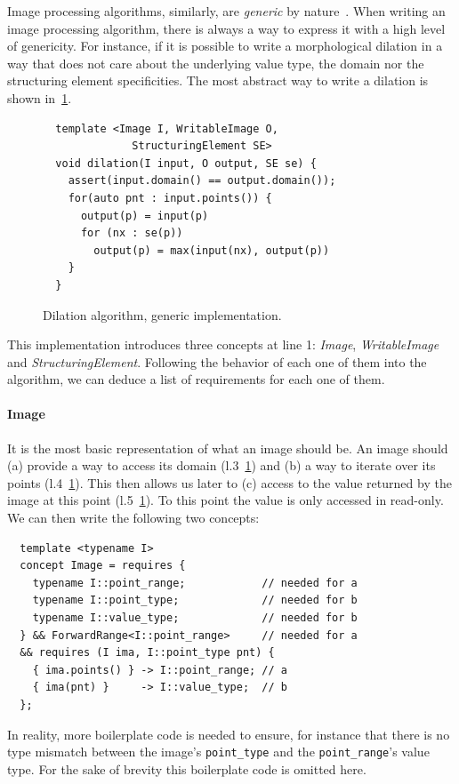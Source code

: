 Image processing algorithms, similarly, are \emph{generic} by
nature~\parencite{ritter.1990.cvgi,geraud.2000.icpr,darbon.2002.ismm,levillain.2010.icip,levillain.2014.ciarp}. When
writing an image processing algorithm, there is always a way to express it with a high level of genericity. For
instance, if it is possible to write a morphological dilation in a way that does not care about the underlying value
type, the domain nor the structuring element specificities. The most abstract way to write a dilation is shown
in~\ref{code:gen.dilate}.

\begin{figure}[htbp]
  \centering
  \begin{verbatim}
  template <Image I, WritableImage O,
              StructuringElement SE>
  void dilation(I input, O output, SE se) {
    assert(input.domain() == output.domain());
    for(auto pnt : input.points()) {
      output(p) = input(p)
      for (nx : se(p))
        output(p) = max(input(nx), output(p))
    }
  }
  \end{verbatim}
  \caption{Dilation algorithm, generic implementation.}
  \label{code:gen.dilate}
\end{figure}

This implementation introduces three concepts at line 1: \emph{Image}, \emph{WritableImage} and
\emph{StructuringElement}. Following the behavior of each one of them into the algorithm, we can deduce a list of
requirements for each one of them.

\paragraph{Image} It is the most basic representation of what an image should be. An image should (a) provide a way to
access its domain (l.3~\ref{code:gen.dilate}) and (b) a way to iterate over its points (l.4~\ref{code:gen.dilate}). This
then allows us later to (c) access to the value returned by the image at this point (l.5~\ref{code:gen.dilate}). To this
point the value is only accessed in read-only. We can then write the following two concepts:
\begin{verbatim}
  template <typename I>
  concept Image = requires {
    typename I::point_range;            // needed for a
    typename I::point_type;             // needed for b
    typename I::value_type;             // needed for b
  } && ForwardRange<I::point_range>     // needed for a
  && requires (I ima, I::point_type pnt) {
    { ima.points() } -> I::point_range; // a
    { ima(pnt) }     -> I::value_type;  // b
  };
\end{verbatim}
In reality, more boilerplate code is needed to ensure, for instance that there is no type mismatch between the image's
\texttt{point\_type} and the \texttt{point\_range}'s value type. For the sake of brevity this boilerplate code is
omitted here.


